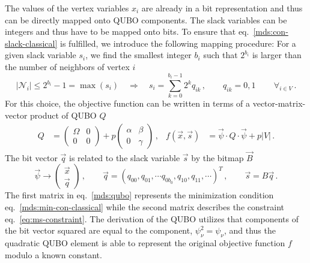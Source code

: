 \documentclass[]{article}
\begin{document}
The values of the vertex variables $x_i$ are already in a bit representation and thus can be directly mapped onto QUBO components.
The slack variables can be integers and thus have to be mapped onto bits.
To ensure that eq.~\eqref{mds:con-slack-classical} is fulfilled, we introduce the following mapping procedure:
For a given slack variable $s_i$, we find the smallest integer $b_i$ such that $2^{b_i}$ is larger than the number of neighbors of vertex $i$
\begin{equation}
	|\mathcal{N}_i| \leq 2^{b_i} - 1 = \max(s_i)
	\quad \Rightarrow \quad 
	s_i = \sum_{k=0}^{b_i-1} 2^k q_{ik}
	\, , \qquad 
	q_{ik} = 0, 1
	\, \qquad
	\forall_{i \in V}
	\, .
\end{equation}
For this choice, the objective function can be written in terms of a vector-matrix-vector product of QUBO $Q$ 
\begin{align}\label{mds:qubo}
	Q &= 
	\begin{pmatrix}\Omega & 0 \\ 0 & 0 \end{pmatrix}
	+ p
	\begin{pmatrix}\alpha & \beta \\ 0 & \gamma \end{pmatrix}
	\, , & 
	f(\vec x, \vec s)
	&=
	\vec \psi \cdot Q \cdot \vec \psi + p |V|
	\, . 
\end{align}
The bit vector $\vec q$ is related to the slack variable $\vec s$ by the bitmap $\vec B$
\begin{equation}
	\vec \psi \to \begin{pmatrix}
		\vec x \\ \vec q
	\end{pmatrix}
	\, , \qquad
	\vec q = (q_{00}, q_{01}, \cdots q_{0 b_0}, q_{10}, q_{11}, \cdots )^T
	\, , \qquad
	\vec s = B \vec q
	\, .
\end{equation}
The first matrix in eq.~\eqref{mds:qubo} represents the minimization condition eq.~\eqref{mds:min-con-classical} while the second matrix describes the constraint eq.~\eqref{eq:ms-constraint}.
The derivation of the QUBO utilizes that components of the bit vector squared are equal to the component, $\psi_\nu^2 = \psi_\nu$, and thus the quadratic QUBO element is able to represent the original objective function $f$ modulo a known constant.
\end{document}
